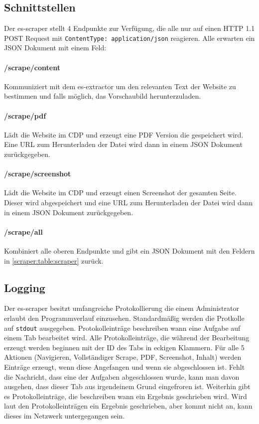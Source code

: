 \subsection{Schnittstellen}
Der es-scraper stellt 4 Endpunkte zur Verfügung, die alle nur auf einen HTTP 1.1 POST Request mit \verb|ContentType: application/json| reagieren. Alle erwarten ein JSON Dokument mit einem  Feld: 
\paragraph{/scrape/content} Kommuniziert mit dem es-extractor um den relevanten Text der Website zu bestimmen und falls möglich, das Vorschaubild herunterzuladen. 
\paragraph{/scrape/pdf} Lädt die Website im CDP und erzeugt eine PDF Version die gespeichert wird. Eine URL zum Herunterladen der Datei wird dann in einem JSON Dokument zurückgegeben.
\paragraph{/scrape/screenshot} Lädt die Website im CDP und erzeugt einen Screenshot der gesamten Seite. Dieser wird abgespeichert und eine URL zum Herunterladen der Datei wird dann in einem JSON Dokument zurückgegeben.
\paragraph{/scrape/all} Kombiniert alle oberen Endpunkte und gibt ein JSON Dokument mit den Feldern in \autoref{scraper:table:scraper} zurück.
 
\subsection{Logging}
Der es-scraper besitzt umfangreiche Protokollierung die einem Administrator erlaubt den Programmverlauf einzusehen. Standardmäßig werden die Protkolle auf \verb|stdout| ausgegeben. Protokolleinträge beschreiben wann eine Aufgabe auf einem Tab bearbeitet wird. Alle Protokolleinträge, die während der Bearbeitung erzeugt werden beginnen mit der ID des Tabs in eckigen Klammern. Für alle 5 Aktionen (Navigieren, Vollständiger Scrape, PDF, Screenshot, Inhalt) werden Einträge erzeugt, wenn diese Angefangen und wenn sie abgeschlossen ist. Fehlt die Nachricht, dass eine der Aufgaben abgeschlossen wurde, kann man davon ausgehen, dass dieser Tab aus irgendeinem Grund eingefroren ist. Weiterhin gibt es Protokolleinträge, die beschreiben wann ein Ergebnis geschrieben wird. Wird laut den Protokolleinträgen ein Ergebnis geschrieben, aber kommt nicht an, kann dieses im Netzwerk untergegangen sein.

